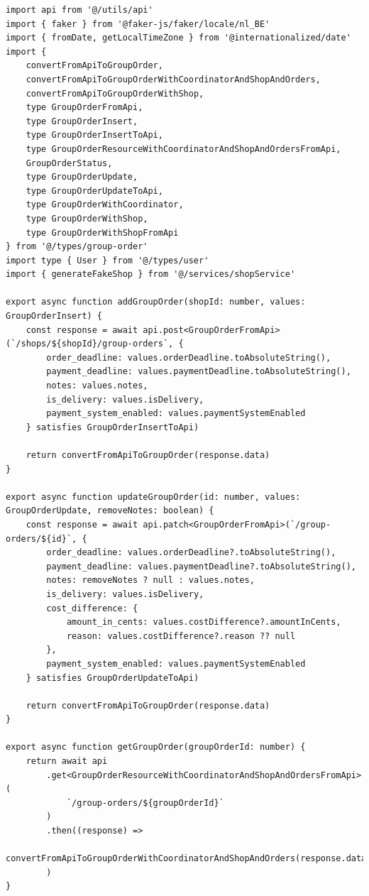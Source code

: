 \begin{verbatim}
import api from '@/utils/api'
import { faker } from '@faker-js/faker/locale/nl_BE'
import { fromDate, getLocalTimeZone } from '@internationalized/date'
import {
    convertFromApiToGroupOrder,
    convertFromApiToGroupOrderWithCoordinatorAndShopAndOrders,
    convertFromApiToGroupOrderWithShop,
    type GroupOrderFromApi,
    type GroupOrderInsert,
    type GroupOrderInsertToApi,
    type GroupOrderResourceWithCoordinatorAndShopAndOrdersFromApi,
    GroupOrderStatus,
    type GroupOrderUpdate,
    type GroupOrderUpdateToApi,
    type GroupOrderWithCoordinator,
    type GroupOrderWithShop,
    type GroupOrderWithShopFromApi
} from '@/types/group-order'
import type { User } from '@/types/user'
import { generateFakeShop } from '@/services/shopService'

export async function addGroupOrder(shopId: number, values: GroupOrderInsert) {
    const response = await api.post<GroupOrderFromApi>(`/shops/${shopId}/group-orders`, {
        order_deadline: values.orderDeadline.toAbsoluteString(),
        payment_deadline: values.paymentDeadline.toAbsoluteString(),
        notes: values.notes,
        is_delivery: values.isDelivery,
        payment_system_enabled: values.paymentSystemEnabled
    } satisfies GroupOrderInsertToApi)

    return convertFromApiToGroupOrder(response.data)
}

export async function updateGroupOrder(id: number, values: GroupOrderUpdate, removeNotes: boolean) {
    const response = await api.patch<GroupOrderFromApi>(`/group-orders/${id}`, {
        order_deadline: values.orderDeadline?.toAbsoluteString(),
        payment_deadline: values.paymentDeadline?.toAbsoluteString(),
        notes: removeNotes ? null : values.notes,
        is_delivery: values.isDelivery,
        cost_difference: {
            amount_in_cents: values.costDifference?.amountInCents,
            reason: values.costDifference?.reason ?? null
        },
        payment_system_enabled: values.paymentSystemEnabled
    } satisfies GroupOrderUpdateToApi)

    return convertFromApiToGroupOrder(response.data)
}

export async function getGroupOrder(groupOrderId: number) {
    return await api
        .get<GroupOrderResourceWithCoordinatorAndShopAndOrdersFromApi>(
            `/group-orders/${groupOrderId}`
        )
        .then((response) =>
            convertFromApiToGroupOrderWithCoordinatorAndShopAndOrders(response.data)
        )
}


\end{verbatim}
